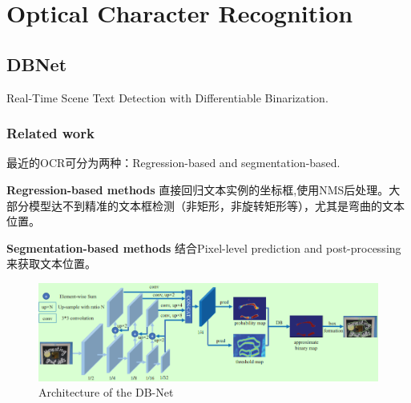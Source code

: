 \documentclass{article}
\begin{document}
\section{Optical Character Recognition}
\subsection{DBNet}
Real-Time Scene Text Detection with Differentiable Binarization\cite{liao2020real}.
\subsubsection{Related work}
最近的OCR可分为两种：Regression-based and segmentation-based.

\textbf{Regression-based methods} 直接回归文本实例的坐标框,使用NMS后处理。大部分模型达不到精准的文本框检测（非矩形，非旋转矩形等），尤其是弯曲的文本位置。

\textbf{Segmentation-based methods} 结合Pixel-level prediction and post-processing 来获取文本位置。
\begin{figure}[htp!]
\centering
\includegraphics[scale=0.4]{images/dbnet.png}
\caption{Architecture of the DB-Net}
\label{Fig.dbnet}
\end{figure}
\end{document}
